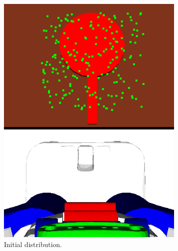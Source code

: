 \begin{figure}[t]
\begin{subfigure}[b]{0.25\linewidth}
    \includegraphics[width=\textwidth]{images/frying_initial.png}
    \caption{Initial distribution.}
  \end{subfigure}
  \begin{subfigure}[b]{0.25\linewidth}

\end{subfigure}
\end{figure}
